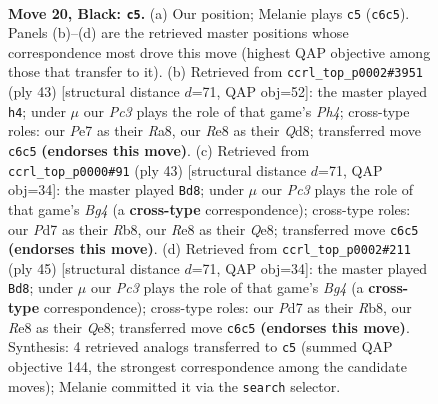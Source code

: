 \documentclass[11pt]{article}
\begin{document}
\clearpage

\begin{figure}[p]\centering
\begin{subfigure}{0.46\textwidth}\centering
\resizebox{\linewidth}{!}{%
\newchessgame
\chessboard[
  setfen={2bqr1k1/p2ppp2/2p4B/5P1Q/P1PbB3/6P1/1r2N2K/R4R2 b - - 1 20},
  showmover=false,
  pgfstyle=straightmove, color=movearrow, markmove={c6-c5}
]}
\caption{}
\end{subfigure}\hfill
\begin{subfigure}{0.46\textwidth}\centering
\resizebox{\linewidth}{!}{%
\newchessgame
\chessboard[
  setfen={r2q2k1/pp3pb1/3p2b1/3Pr2p/P1p1P3/2P3PB/3N1P2/R2QR1K1 b - - 1 22},
  showmover=false,
  pgfstyle=straightmove, color=movearrow, markmove={h5-h4}
]}
\caption{}
\end{subfigure}
\\[4pt]
\begin{subfigure}{0.46\textwidth}\centering
\resizebox{\linewidth}{!}{%
\newchessgame
\chessboard[
  setfen={1r2q2k/3b2pp/3p4/3Nprb1/pPB5/R5P1/1P2QP1P/5RK1 b - - 0 22},
  showmover=false,
  pgfstyle=straightmove, color=movearrow, markmove={g5-d8}
]}
\caption{}
\end{subfigure}\hfill
\begin{subfigure}{0.46\textwidth}\centering
\resizebox{\linewidth}{!}{%
\newchessgame
\chessboard[
  setfen={1r2q2k/3b2pp/3p4/3Nprb1/pPB5/R5P1/1P2QP1P/5RK1 b - - 0 23},
  showmover=false,
  pgfstyle=straightmove, color=movearrow, markmove={g5-d8}
]}
\caption{}
\end{subfigure}
\caption{\textbf{Move 20, Black: \texttt{c5}.} (a) Our position; Melanie plays \texttt{c5} (\texttt{c6c5}). Panels (b)--(d) are the retrieved master positions whose correspondence most drove this move (highest QAP objective among those that transfer to it). (b) Retrieved from \texttt{ccrl\_top\_p0002\#3951} (ply 43) [structural distance $d$=71, QAP obj=52]: the master played \texttt{h4}; under $\mu$ our \emph{Pc3} plays the role of that game's \emph{Ph4}; cross-type roles: our \emph{P}e7 as their \emph{R}a8, our \emph{R}e8 as their \emph{Q}d8; transferred move \texttt{c6c5} \textbf{(endorses this move)}. (c) Retrieved from \texttt{ccrl\_top\_p0000\#91} (ply 43) [structural distance $d$=71, QAP obj=34]: the master played \texttt{Bd8}; under $\mu$ our \emph{Pc3} plays the role of that game's \emph{Bg4} (a \textbf{cross-type} correspondence); cross-type roles: our \emph{P}d7 as their \emph{R}b8, our \emph{R}e8 as their \emph{Q}e8; transferred move \texttt{c6c5} \textbf{(endorses this move)}. (d) Retrieved from \texttt{ccrl\_top\_p0002\#211} (ply 45) [structural distance $d$=71, QAP obj=34]: the master played \texttt{Bd8}; under $\mu$ our \emph{Pc3} plays the role of that game's \emph{Bg4} (a \textbf{cross-type} correspondence); cross-type roles: our \emph{P}d7 as their \emph{R}b8, our \emph{R}e8 as their \emph{Q}e8; transferred move \texttt{c6c5} \textbf{(endorses this move)}. Synthesis: 4 retrieved analogs transferred to \texttt{c5} (summed QAP objective 144, the strongest correspondence among the candidate moves); Melanie committed it via the \texttt{search} selector.}
\label{fig:thought-m39}
\end{figure}
\end{document}
